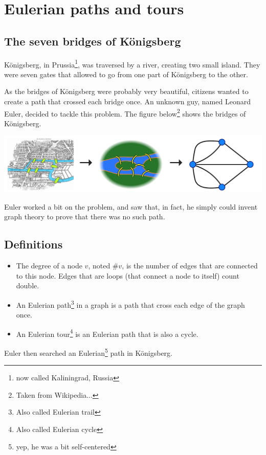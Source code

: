 \section{Eulerian paths and tours}
\subsection{The seven bridges of Königsberg}
Königsberg, in Prussia\footnote{now called Kaliningrad, Russia}, was traversed by a river, creating two small island. They were seven gates that allowed to go from one part of Königsberg to the other.

As the bridges of Königsberg were probably very beautiful, citizens wanted to create a path that crossed each bridge once. An unknown guy, named Leonard Euler, decided to tackle this problem. The figure below\footnote{Taken from Wikipedia...} shows the bridges of Königsberg.

\begin{center}
	\includegraphics[width=\textwidth]{./img/konisberg.png}
\end{center}

Euler worked a bit on the problem, and saw that, in fact, he simply could invent graph theory to prove that there was no such path.

\subsection{Definitions}
\begin{itemize}
\item The degree of a node $v$, noted $\#v$, is the number of edges that are connected to this node. Edges that are loops (that connect a node to itself) count double.
\item An Eulerian path\footnote{Also called Eulerian trail} in a graph is a path that cross each edge of the graph once.
\item An Eulerian tour\footnote{Also called Eulerian cycle} is an Eulerian path that is also a cycle.
\end{itemize}

Euler then searched an Eulerian\footnote{yep, he was a bit self-centered} path in Königsberg.

